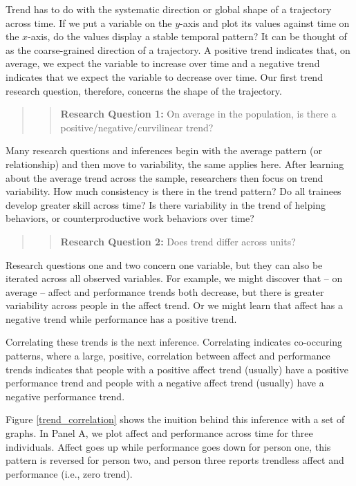 \documentclass[english,,man]{apa6}
\begin{document}
Trend has to do with the systematic direction or global shape of a trajectory across time. If we put a variable on the \(y\)-axis and plot its values against time on the \(x\)-axis, do the values display a stable temporal pattern? It can be thought of as the coarse-grained direction of a trajectory. A positive trend indicates that, on average, we expect the variable to increase over time and a negative trend indicates that we expect the variable to decrease over time. Our first trend research question, therefore, concerns the shape of the trajectory.

\begin{quote}
\begin{quote}
\textbf{Research Question 1:} On average in the population, is there a positive/negative/curvilinear trend?
\end{quote}
\end{quote}

Many research questions and inferences begin with the average pattern (or relationship) and then move to variability, the same applies here. After learning about the average trend across the sample, researchers then focus on trend variability. How much consistency is there in the trend pattern? Do all trainees develop greater skill across time? Is there variability in the trend of helping behaviors, or counterproductive work behaviors over time?

\begin{quote}
\begin{quote}
\textbf{Research Question 2:} Does trend differ across units?
\end{quote}
\end{quote}

Research questions one and two concern one variable, but they can also be iterated across all observed variables. For example, we might discover that -- on average -- affect and performance trends both decrease, but there is greater variability across people in the affect trend. Or we might learn that affect has a negative trend while performance has a positive trend.

Correlating these trends is the next inference. Correlating indicates co-occuring patterns, where a large, positive, correlation between affect and performance trends indicates that people with a positive affect trend (usually) have a positive performance trend and people with a negative affect trend (usually) have a negative performance trend.

Figure \ref{trend_correlation} shows the inuition behind this inference with a set of graphs. In Panel A, we plot affect and performance across time for three individuals. Affect goes up while performance goes down for person one, this pattern is reversed for person two, and person three reports trendless affect and performance (i.e., zero trend).
\end{document}
